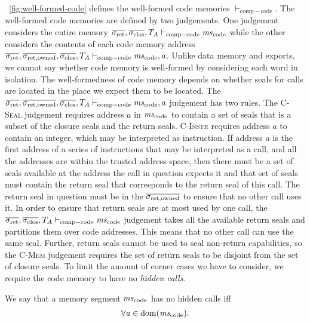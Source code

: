 \documentclass{jfp}
\newenvironment{jversion}{}{}
\begin{document}
\begin{jversion}
\figurename~\ref{fig:well-formed-code} defines the well-formed code memories $\vdash_{\mathrm{comp-code}}$.
The well-formed code memories are defined by two judgements.
One judgement considers the entire memory $\sigrets,\sigcloss,\ta\vdash_{\mathrm{comp-code}} \mscode$ while the other considers the contents of each code memory address $\sigrets,\sigrets[\mathrm{owned}],\sigcloss,\ta \vdash_{\mathrm{comp-code}} \mscode,a$.
Unlike data memory and exports, we cannot say whether code memory is well-formed by considering each word in isolation.
The well-formedness of code memory depends on whether seals for calls are located in the place we expect them to be located.
The $\sigrets,\sigrets[\mathrm{owned}],\sigcloss,\ta \vdash_{\mathrm{comp-code}} \mscode,a$ judgement has two rules.
The \textsc{C-Seal} judgement requires address $a$ in $\mscode$ to contain a set of seals that is a subset of the closure seals and the return seals.
\textsc{C-Instr} requires address $a$ to contain an integer, which may be interpreted as instruction.
If address $a$ is the first address of a series of instructions that may be interpreted as a call, and all the addresses are within the trusted address space, then there must be a set of seals available at the address the call in question expects it and that set of seals must contain the return seal that corresponds to the return seal of this call.
The return seal in question must be in the $\sigrets[\mathrm{owned}]$ to ensure that no other call uses it.
In order to ensure that return seals are at most used by one call, the $\sigrets,\sigcloss,\ta\vdash_{\mathrm{comp-code}} \mscode$ judgement takes all the available return seals and partitions them over code addresses. 
This means that no other call can use the same seal.
Further, return seals cannot be used to seal non-return capabilities, so the \textsc{C-Mem} judgement requires the set of return seals to be disjoint from the set of closure seals.
To limit the amount of corner cases we have to consider, we require the code memory to have no \textit{hidden calls}.
\begin{definition}
  \label{def:no-hidden-calls}
  We say that a memory segment $\mscode$ has no hidden calls iff
  \[
    \begin{array}{l}
      \forall \aaddr \in \dom(\mscode) \ldotp \\

\end{array}\]
\end{definition}
\end{jversion}
\end{document}
